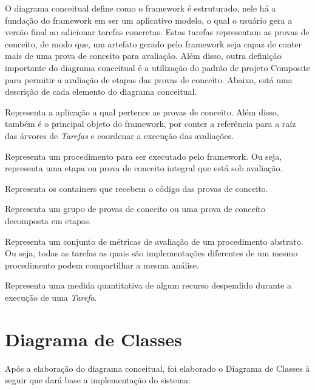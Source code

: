\documentclass[12pt]{tcc}
\begin{document}
O diagrama conceitual define como o framework é estruturado, nele há a fundação do framework em ser um aplicativo modelo, o qual o usuário gera a versão final ao adicionar tarefas concretas.
Estas tarefas representam as provas de conceito, de modo que, um artefato gerado pelo framework seja capaz de conter mais de uma prova de conceito para avaliação.
Além disso, outra definição importante do diagrama conceitual é a utilização do padrão de projeto Composite \citep{Gamma1995Design} para permitir a avaliação de etapas das provas de conceito.
Abaixo, está uma descrição de cada elemento do diagrama conceitual.

\begin{description}
	\label{descrip:diagrama-conceitual}

	\item[Projeto:] Representa a aplicação a qual pertence as provas de conceito. Além disso, também é o principal objeto do framework, por conter a referência para a raíz das árvores de \textit{Tarefas} e coordenar a execução das avaliações.
	
	\item[Tarefa Abstrata:] Representa um procedimento para ser executado pelo framework. Ou seja, representa uma etapa ou prova de conceito integral que está sob avaliação.

	\item[Tarefa Simples:] Representa os containers que recebem o código das provas de conceito.

	\item[Tarefa Composta:] Representa um grupo de provas de conceito ou uma prova de conceito decomposta em etapas.

	\item[Análise:] Representa um conjunto de métricas de avaliação de um procedimento abstrato. Ou seja, todas as tarefas as quais são implementações diferentes de um mesmo procedimento podem compartilhar a mesma análise.

	\item[Métrica:] Representa uma medida quantitativa de algum recurso despendido durante a execução de uma \textit{Tarefa}.

\end{description}


\section{Diagrama de Classes}

Após a elaboração do diagrama conceitual, foi elaborado o Diagrama de Classes à seguir que dará base a implementação do sistema: 
\end{document}
